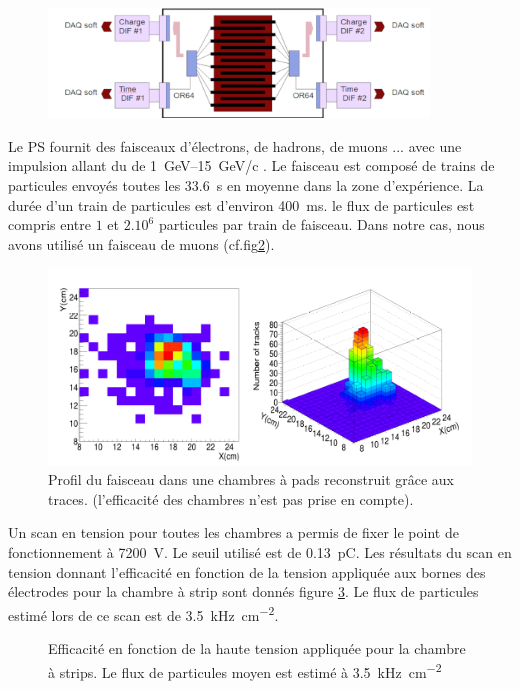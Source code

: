 \begin{figure}[ht!]
	\centering
	\includegraphics[width=0.9\textwidth]{GLA/SchemePS.png}
	\label{SchemePS}
\end{figure}

Le PS fournit des faisceaux d'électrons, de hadrons, de muons ... avec une impulsion allant du de \SIrange{1}{15}{\giga\eV}/c . Le faisceau est composé de trains de particules envoyés toutes les \SI{33.6}{\second} en moyenne dans la zone d'expérience. La durée d'un train de particules est d'environ \SI{400}{\milli\second}. le flux de particules est compris entre $1$ et $2.10^{6}$ particules par train de faisceau. Dans notre cas, nous avons utilisé un faisceau de muons (cf.fig\ref{faisceauPS}).
 
\begin{figure}
	\centering
	\includegraphics[width=0.8\linewidth]{GLA/FaisceauPS.png}
	\caption{Profil du faisceau dans une chambres à pads reconstruit grâce aux traces. (l'efficacité des chambres n'est pas prise en compte).}
	\label{faisceauPS}
\end{figure}

Un scan en tension pour toutes les chambres a permis de fixer le point de fonctionnement à \SI{7200}{\volt}. Le seuil utilisé est de \SI{0.13}{\pico\coulomb}. Les résultats du scan en tension donnant l'efficacité en fonction de la tension appliquée aux bornes des électrodes pour la chambre à strip sont donnés figure \ref{ScanTensionPS}. Le flux de particules estimé lors de ce scan est de \SI{3.5}{\kilo\hertz\per\square\centi\meter}.

\begin{figure}[!ht]
	\centering
	\scalebox{1.4}{}
	\caption{Efficacité en fonction de la haute tension appliquée pour la chambre à strips. Le flux de particules moyen est estimé à \SI{3.5}{\kilo\hertz\per\square\centi\meter}}
	\label{ScanTensionPS}
\end{figure}

